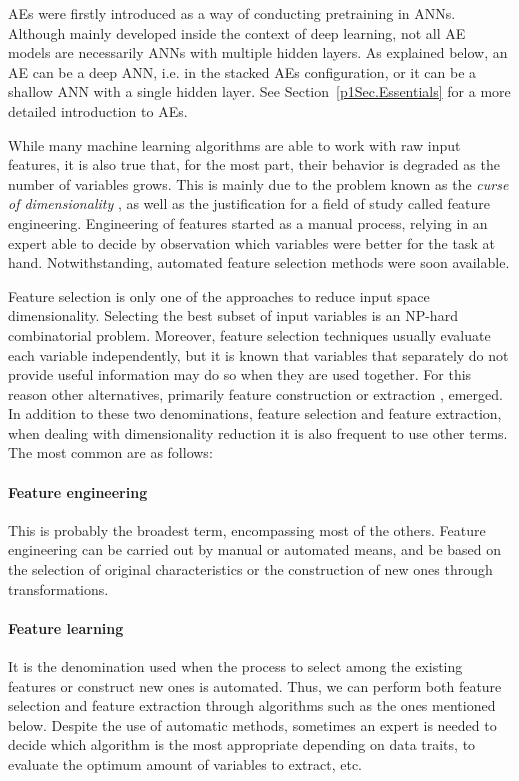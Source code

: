AEs were firstly introduced  as a way of conducting pretraining in ANNs. Although mainly developed inside the context of deep learning, not all AE models are necessarily ANNs with multiple hidden layers. As explained below, an AE can be a deep ANN, i.e. in the stacked AEs configuration, or it can be a shallow ANN with a single hidden layer. See Section~\ref{p1Sec.Essentials} for a more detailed introduction to AEs.

While many machine learning algorithms are able to work with raw input features, it is also true that, for the most part, their behavior is degraded as the number of variables grows. This is mainly due to the problem known as the \textit{curse of dimensionality} , as well as the justification for a field of study called feature engineering. Engineering of features started as a manual process, relying in an expert able to decide by observation which variables were better for the task at hand. Notwithstanding, automated feature selection  methods were soon available.

Feature selection is only one of the approaches to reduce input space dimensionality. Selecting the best subset of input variables is an NP-hard combinatorial problem. Moreover, feature selection techniques usually evaluate each variable independently, but it is known that variables that separately do not provide useful information may do so when they are used together. For this reason other alternatives, primarily feature construction or extraction , emerged. In addition to these two denominations, feature selection and feature extraction, when dealing with dimensionality reduction it is also frequent to use other terms. The most common are as follows:

	\paragraph{Feature engineering }
	This is probably the broadest term, encompassing most of the others. Feature engineering can be carried out by manual or automated means, and be based on the selection of original characteristics or the construction of new ones through transformations. 

	\paragraph{Feature learning }
	It is the denomination used when the process to select among the existing features or construct new ones is automated. Thus, we can perform both feature selection and feature extraction through algorithms such as the ones mentioned below. Despite the use of automatic methods, sometimes an expert is needed to decide which algorithm is the most appropriate depending on data traits, to evaluate the optimum amount of variables to extract, etc.
	
